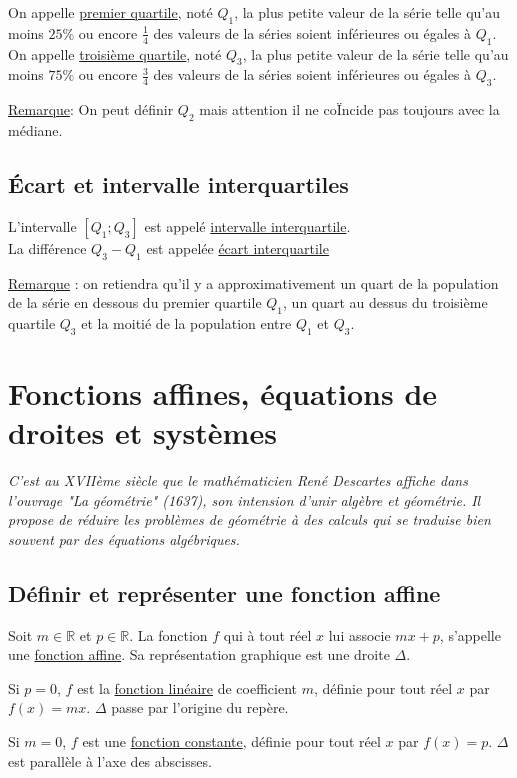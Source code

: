 \documentclass[french]{book}
\begin{document}
\begin{defn}
On appelle \underline{premier quartile}, noté $Q_1$, la plus petite valeur de la série telle qu'au moins $25\% $ ou encore $\frac{1}{4}$ des valeurs de la séries soient inférieures ou égales à $Q_1$.\\

On appelle \underline{troisième quartile}, noté $Q_3$, la plus petite valeur de la série telle qu'au moins $75\% $ ou encore $\frac{3}{4}$ des valeurs de la séries soient inférieures ou égales à $Q_3$.
\end{defn}

\underline{Remarque}: On peut définir $Q_2$ mais attention il ne coÏncide pas toujours avec la médiane.\\

\section{Écart et intervalle interquartiles}

\begin{defn}
L'intervalle $[Q_1;Q_3]$ est appelé \underline{intervalle interquartile}.\\
La différence $Q_3-Q_1$ est appelée \underline{écart interquartile}
\end{defn}

\underline{Remarque} : on retiendra qu'il y a approximativement un quart de la population de la série en dessous du premier quartile $Q_1$, un quart au dessus du troisième quartile $Q_3$ et la moitié de la population entre $Q_1$ et $Q_3$. 

\chapter{Fonctions affines, équations de droites et systèmes}

\textit{C'est au XVIIème siècle que le mathématicien René Descartes affiche dans  l'ouvrage "La géométrie" (1637), son intension d'unir algèbre et géométrie. Il propose de réduire les problèmes de géométrie à des calculs qui se traduise bien souvent par des équations algébriques.}


\section{Définir et représenter une fonction affine}

\begin{defn}
Soit $m \in \mathbb{R}$ et $p \in \mathbb{R}$. La fonction $f$ qui à tout réel $x$ lui associe $mx+p$, s'appelle une \underline{fonction affine}. Sa représentation graphique est une droite $\Delta$.

Si $p=0$, $f$ est la \underline{fonction linéaire} de coefficient $m$, définie pour tout réel $x$ par $f(x)=mx$. $\Delta$ passe par l'origine du repère.

Si $m=0$, $f$ est une \underline{fonction constante}, définie pour tout réel $x$ par $f(x)=p$. $\Delta$ est parallèle à l'axe des abscisses.
\end{defn}
\end{document}
